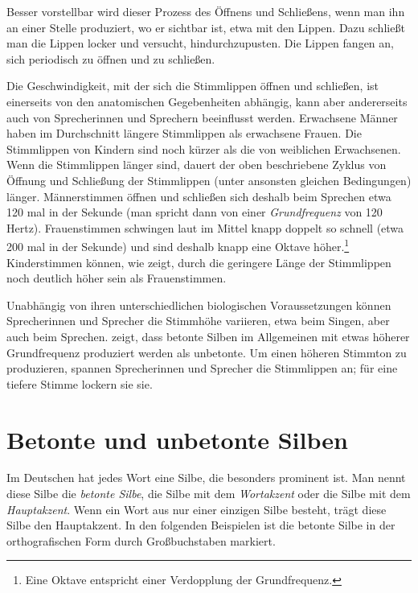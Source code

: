 Besser vorstellbar wird dieser Prozess des Öffnens und Schließens, wenn man ihn an einer Stelle produziert, wo er sichtbar ist, etwa mit den Lippen. Dazu schließt man die Lippen locker und versucht, hindurchzupusten. Die Lippen fangen an, sich periodisch zu öffnen und zu schließen.

Die Geschwindigkeit, mit der sich die Stimmlippen öffnen und schließen, ist einerseits von den anatomischen Gegebenheiten abhängig, kann aber andererseits auch von Sprecherinnen und Sprechern beeinflusst werden. Erwachsene Männer haben im Durchschnitt längere Stimmlippen als erwachsene Frauen. Die Stimmlippen von Kindern sind noch kürzer als die von weiblichen Erwachsenen. Wenn die Stimmlippen länger sind, dauert der oben beschriebene Zyklus von Öffnung und Schließung der Stimmlippen (unter ansonsten gleichen Bedingungen) länger. Männerstimmen öffnen und schließen sich deshalb beim Sprechen etwa 120 mal in der Sekunde (man spricht dann von einer \textit{Grundfrequenz} von 120 Hertz). Frauenstimmen schwingen laut \citet{TraunmuellerEriksson1994} im Mittel knapp doppelt so schnell (etwa 200 mal in der Sekunde) und sind deshalb knapp eine Oktave höher.\footnote{Eine Oktave entspricht einer Verdopplung der Grundfrequenz.} Kinderstimmen können, wie \citet{Reubold2012} zeigt, durch die geringere Länge der Stimmlippen noch deutlich höher sein als Frauenstimmen.

Unabhängig von ihren unterschiedlichen biologischen Voraussetzungen können Sprecherinnen und Sprecher die Stimmhöhe variieren, etwa beim Singen, aber auch beim Sprechen. \citet{Fry1958} zeigt, dass betonte Silben im Allgemeinen mit etwas höherer Grundfrequenz produziert werden als unbetonte. Um einen höheren Stimmton zu produzieren, spannen Sprecherinnen und Sprecher die Stimmlippen an; für eine tiefere Stimme lockern sie sie.

\section{Betonte und unbetonte Silben}\label{section:betonte_unbetonte_Silben}
Im Deutschen hat jedes Wort eine Silbe, die besonders prominent ist. Man nennt diese Silbe die \textit{betonte Silbe}, die Silbe mit dem \textit{Wortakzent} oder die Silbe mit dem \textit{Hauptakzent}. Wenn ein Wort aus nur einer einzigen Silbe besteht, trägt diese Silbe den Hauptakzent. In den folgenden Beispielen ist die betonte Silbe in der orthografischen Form durch Großbuchstaben markiert.

